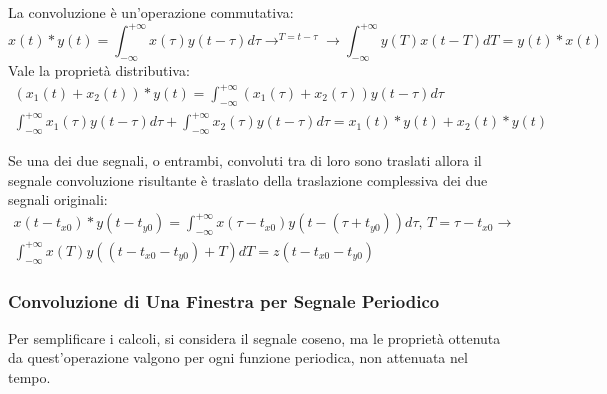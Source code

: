\documentclass{article}
\numberwithin{equation}{subsection}
\begin{document}
La convoluzione è un'operazione commutativa:
\begin{equation*}
    x(t)*y(t)=\displaystyle\int_{-\infty}^{+\infty}x(\tau)y(t-\tau)d\tau \to^{T=t-\tau}\to \int_{-\infty}^{+\infty}y(T)x(t-T)dT=y(t)*x(t)
\end{equation*}
Vale la proprietà distributiva:
\begin{gather*}
    (x_1(t)+x_2(t))*y(t)=\displaystyle\int_{-\infty}^{+\infty}(x_1(\tau)+x_2(\tau))y(t-\tau)d\tau\\
    \int_{-\infty}^{+\infty}x_1(\tau)y(t-\tau)d\tau+\int_{-\infty}^{+\infty}x_2(\tau)y(t-\tau)d\tau=x_1(t)*y(t)+x_2(t)*y(t)
\end{gather*}

Se una dei due segnali, o entrambi, convoluti tra di loro sono traslati allora il segnale convoluzione risultante è traslato della traslazione complessiva dei due segnali originali:
\begin{gather*}
    x(t-t_{x0})*y(t-t_{y0})=\displaystyle\int_{-\infty}^{+\infty}x(\tau-t_{x0})y(t-(\tau+t_{y0}))d\tau,\,{T=\tau-t_{x0}}\to\\
    \int_{-\infty}^{+\infty}x(T)y((t-t_{x0}-t_{y0})+T)dT=z(t-t_{x0}-t_{y0})
\end{gather*}

\subsubsection{Convoluzione di Una Finestra per Segnale Periodico}


Per semplificare i calcoli, si considera il segnale coseno, ma le proprietà ottenuta da quest'operazione valgono per ogni funzione periodica, non attenuata nel tempo. 
\end{document}
